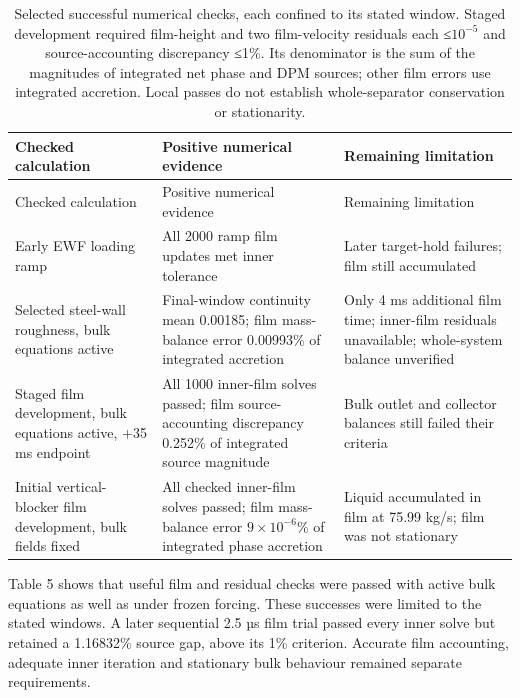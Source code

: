 \begin{longtable}{@{}>{\raggedright\arraybackslash}p{0.29000000\dimexpr\linewidth-4\tabcolsep\relax}>{\raggedright\arraybackslash}p{0.34000000\dimexpr\linewidth-4\tabcolsep\relax}>{\raggedright\arraybackslash}p{0.37000000\dimexpr\linewidth-4\tabcolsep\relax}@{}}
\caption{Selected successful numerical checks, each confined to its stated window. Staged development required film-height and two film-velocity residuals each ≤\(10^{-5}\) and source-accounting discrepancy ≤1\%. Its denominator is the sum of the magnitudes of integrated net phase and DPM sources; other film errors use integrated accretion. Local passes do not establish whole-separator conservation or stationarity.}\label{tab:table-5}\\
\toprule
Checked calculation & Positive numerical evidence & Remaining limitation \\
\midrule
\endfirsthead
\toprule
Checked calculation & Positive numerical evidence & Remaining limitation \\
\midrule
\endhead
Early EWF loading ramp & All 2000 ramp film updates met inner tolerance & Later target-hold failures; film still accumulated \\
Selected steel-wall roughness, bulk equations active & Final-window continuity mean 0.00185; film mass-balance error 0.00993\% of integrated accretion & Only 4 ms additional film time; inner-film residuals unavailable; whole-system balance unverified \\
Staged film development, bulk equations active, +35 ms endpoint & All 1000 inner-film solves passed; film source-accounting discrepancy 0.252\% of integrated source magnitude & Bulk outlet and collector balances still failed their criteria \\
Initial vertical-blocker film development, bulk fields fixed & All checked inner-film solves passed; film mass-balance error \(9 \times 10^{-6}\)\% of integrated phase accretion & Liquid accumulated in film at 75.99 kg/s; film was not stationary \\
\bottomrule
\end{longtable}

Table 5 shows that useful film and residual checks were passed with active bulk equations as well as under frozen forcing. These successes were limited to the stated windows. A later sequential 2.5 µs film trial passed every inner solve but retained a 1.16832\% source gap, above its 1\% criterion. Accurate film accounting, adequate inner iteration and stationary bulk behaviour remained separate requirements.

